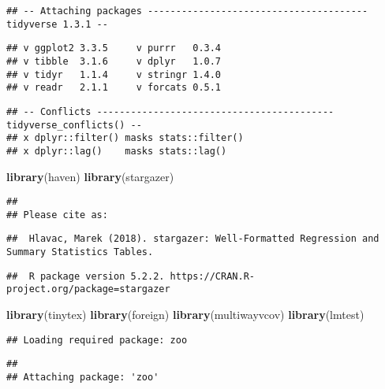 \documentclass[
  12pt,
  landscape]{article}
\newenvironment{Shaded}{\begin{snugshade}}{\end{snugshade}}
\newcommand{\KeywordTok}[1]{\textcolor[rgb]{0.13,0.29,0.53}{\textbf{#1}}}
\newcommand{\NormalTok}[1]{#1}
\begin{document}
\begin{verbatim}
## -- Attaching packages --------------------------------------- tidyverse 1.3.1 --
\end{verbatim}

\begin{verbatim}
## v ggplot2 3.3.5     v purrr   0.3.4
## v tibble  3.1.6     v dplyr   1.0.7
## v tidyr   1.1.4     v stringr 1.4.0
## v readr   2.1.1     v forcats 0.5.1
\end{verbatim}

\begin{verbatim}
## -- Conflicts ------------------------------------------ tidyverse_conflicts() --
## x dplyr::filter() masks stats::filter()
## x dplyr::lag()    masks stats::lag()
\end{verbatim}

\begin{Shaded}
\begin{Highlighting}[]
\KeywordTok{library}\NormalTok{(haven)}
\KeywordTok{library}\NormalTok{(stargazer)}
\end{Highlighting}
\end{Shaded}

\begin{verbatim}
## 
## Please cite as:
\end{verbatim}

\begin{verbatim}
##  Hlavac, Marek (2018). stargazer: Well-Formatted Regression and Summary Statistics Tables.
\end{verbatim}

\begin{verbatim}
##  R package version 5.2.2. https://CRAN.R-project.org/package=stargazer
\end{verbatim}

\begin{Shaded}
\begin{Highlighting}[]
\KeywordTok{library}\NormalTok{(tinytex)}
\KeywordTok{library}\NormalTok{(foreign)}
\KeywordTok{library}\NormalTok{(multiwayvcov)}
\KeywordTok{library}\NormalTok{(lmtest)}
\end{Highlighting}
\end{Shaded}

\begin{verbatim}
## Loading required package: zoo
\end{verbatim}

\begin{verbatim}
## 
## Attaching package: 'zoo'
\end{verbatim}
\end{document}

